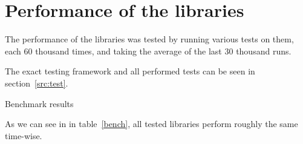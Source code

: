 \section{Performance of the libraries}
The performance of the libraries was tested by running various tests on them,
each 60 thousand times, and taking the average of the last 30 thousand runs.

The exact testing framework and all performed tests can be seen in
section~\ref{src:test}.

\begin{table}[ht]

\caption{Benchmark results}
\label{bench}
\end{table}

As we can see in in table~\ref{bench}, all tested libraries perform roughly
the same time-wise.
